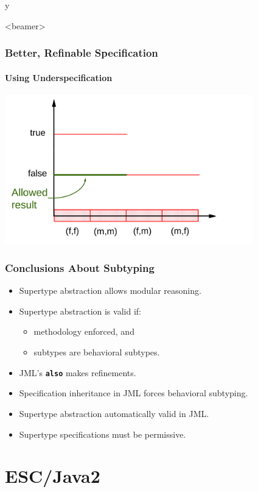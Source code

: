 \if y\MAKEHANDOUTS \documentclass[t,compress,landscape,handout]{beamer}
\newcommand{\JMLKW}[1]{\textcolor{violet!80!black}{\textbf{\texttt{#1}}}}
\begin{document}
\begin{frame}<beamer>
\frametitle{Better, Refinable Specification}
\framesubtitle{Using Underspecification}
\includegraphics[width=4.25in]{equalsgood}
\end{frame}

\begin{frame}
\frametitle{Conclusions About Subtyping}
\begin{itemize}
\item
Supertype abstraction allows modular reasoning.

\item
Supertype abstraction is valid if:
\begin{itemize}
\item
methodology enforced, and

\item
subtypes are behavioral subtypes.
\end{itemize}

\item
JML's \JMLKW{also} makes refinements.

\item
Specification inheritance in JML
forces behavioral subtyping.

\item
Supertype abstraction 
automatically valid in JML.

\item
Supertype specifications must be permissive.
\end{itemize}
\end{frame}


\section[ESC]{ESC/Java2}
\end{document}
